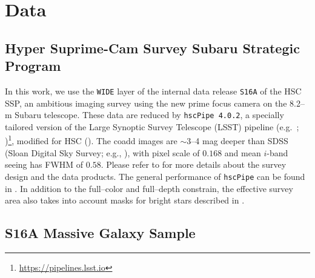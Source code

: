 \documentclass[a4paper,fleqn,usenatbib]{mnras}
\begin{document}
\section{Data}
    \label{sec:data}


\subsection{Hyper Suprime-Cam Survey Subaru Strategic Program}
    \label{sec:hsc}      


	
	In this work, we use the \texttt{WIDE} layer of the internal data release 
	\texttt{S16A} of the HSC SSP, an ambitious imaging survey using the new prime focus 
	camera on the 8.2--m Subaru telescope. 
	These data are reduced by \texttt{hscPipe 4.0.2}, a specially tailored version of 
	the Large Synoptic Survey Telescope (LSST) pipeline (e.g.\ \citealt{Juric2015}; 
	\citealt{Axelrod2010})\footnote{\url{https://pipelines.lsst.io}}, 
	modified for HSC (\citealt{HSC-PIPE}).
	The coadd images are $\sim$3--4 mag deeper than SDSS (Sloan Digital Sky Survey; 
	e.g., \citealt{SDSS-DR7, SDSS-DR8, SDSS-DR12}), with pixel scale of 0\asec{}$.168$
	and mean $i$-band seeing has FWHM of 0\asec{}$.58$.
	Please refer to \citet{HSC-SSP, HSC-DR1} for more details about the survey design
	and the data products.
	The general performance of \texttt{hscPipe} can be found in \citet{SynPipe}.
	In addition to the full--color and full--depth constrain, the effective survey 
	area also takes into account masks for bright stars described in
	\citet{HSC-STAR}.


\subsection{S16A Massive Galaxy Sample}
    \label{sec:sample}	
\end{document}
